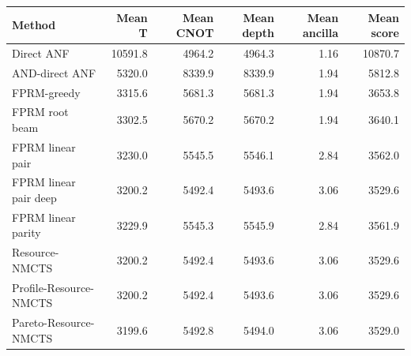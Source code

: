 \begin{tabular}{lrrrrr}
\toprule
Method & Mean T & Mean CNOT & Mean depth & Mean ancilla & Mean score \\
\midrule
Direct ANF & 10591.8 & 4964.2 & 4964.3 & 1.16 & 10870.7 \\
AND-direct ANF & 5320.0 & 8339.9 & 8339.9 & 1.94 & 5812.8 \\
FPRM-greedy & 3315.6 & 5681.3 & 5681.3 & 1.94 & 3653.8 \\
FPRM root beam & 3302.5 & 5670.2 & 5670.2 & 1.94 & 3640.1 \\
FPRM linear pair & 3230.0 & 5545.5 & 5546.1 & 2.84 & 3562.0 \\
FPRM linear pair deep & 3200.2 & 5492.4 & 5493.6 & 3.06 & 3529.6 \\
FPRM linear parity & 3229.9 & 5545.3 & 5545.9 & 2.84 & 3561.9 \\
Resource-NMCTS & 3200.2 & 5492.4 & 5493.6 & 3.06 & 3529.6 \\
Profile-Resource-NMCTS & 3200.2 & 5492.4 & 5493.6 & 3.06 & 3529.6 \\
Pareto-Resource-NMCTS & 3199.6 & 5492.8 & 5494.0 & 3.06 & 3529.0 \\
\bottomrule
\end{tabular}
